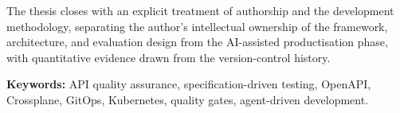 The thesis closes with an explicit treatment of authorship and the development methodology, separating the author's intellectual ownership of the framework, architecture, and evaluation design from the AI-assisted productisation phase, with quantitative evidence drawn from the version-control history.

\noindent\textbf{Keywords:} API quality assurance, specification-driven testing, OpenAPI, Crossplane, GitOps, Kubernetes, quality gates, agent-driven development.

\clearpage
